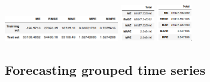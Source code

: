 \documentclass[c, dvipsnames]{beamer}  %
\begin{document}
\begin{frame}[shrink=5]
\frametitle{\insertsection} 
\framesubtitle{\insertsubsection}



%
%

\hfil\hfil\includegraphics[width=5cm]{screenshot041}\hfil\hfil
\includegraphics[width=1.5cm]{screenshot036}\hfil\hfil
\includegraphics[width=1.5cm]{screenshot042}\newline


\end{frame}







\subsection{Forecasting 	grouped time series}
\end{document}

